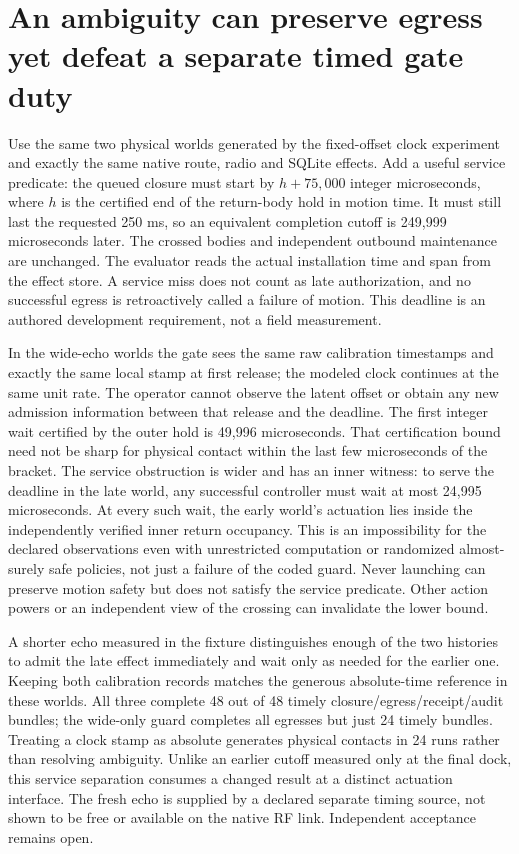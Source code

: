 \documentclass{article}
\begin{document}
\section*{An ambiguity can preserve egress yet defeat a separate timed gate duty}
Use the same two physical worlds generated by the fixed-offset clock
experiment and exactly the same native route, radio and SQLite effects.
Add a useful service predicate: the queued closure must start by
$h+75,000$ integer microseconds, where $h$ is the certified end of
the return-body hold in motion time. It must still last the requested
250 ms, so an equivalent completion cutoff is 249,999 microseconds
later. The crossed bodies and independent outbound maintenance are
unchanged. The evaluator reads the actual installation time and span
from the effect store. A service miss does not count as late
authorization, and no successful egress is retroactively called a
failure of motion. This deadline is an authored development
requirement, not a field measurement.

In the wide-echo worlds the gate sees the same raw calibration
timestamps and exactly the same local stamp at first release;
the modeled clock continues at the same unit rate. The operator
cannot observe the latent offset or obtain any new admission
information between that release and the deadline. The first
integer wait certified by the outer hold is 49,996 microseconds.
That certification bound need not be sharp for physical contact
within the last few microseconds of the bracket. The service
obstruction is wider and has an inner witness: to serve the
deadline in the late world, any successful controller must wait
at most 24,995 microseconds. At every such wait, the early
world's actuation lies inside the independently verified inner
return occupancy. This is an impossibility for
the declared observations even with unrestricted computation or
randomized almost-surely safe policies, not just a failure of the
coded guard. Never launching can preserve motion safety but does
not satisfy the service predicate. Other action powers or an
independent view of the crossing can invalidate the lower bound.

A shorter echo measured in the fixture distinguishes enough of the
two histories to admit the late effect immediately and wait only
as needed for the earlier one. Keeping both calibration records
matches the generous absolute-time reference in these worlds.
All three complete 48 out of 48 timely closure/egress/receipt/audit
bundles; the wide-only guard completes all egresses but just 24
timely bundles. Treating a clock stamp as absolute generates
physical contacts in 24 runs rather than resolving ambiguity.
Unlike an earlier cutoff measured only at the final dock, this
service separation consumes a changed result at a distinct
actuation interface. The fresh echo is supplied by a declared
separate timing source, not shown to be free or available on the
native RF link. Independent acceptance remains open.
\end{document}
